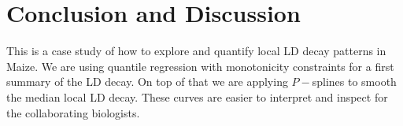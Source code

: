 \documentclass[twoside]{report}
\begin{document}

\section{Conclusion and Discussion}
This is a case study of how to explore and quantify local LD decay patterns in Maize. We are using
quantile regression with monotonicity constraints for a first summary of the LD decay. 
On top of that we are applying $P-$splines to smooth the median local LD decay. These curves 
are easier to interpret and inspect for the collaborating biologists. 
\end{document}
